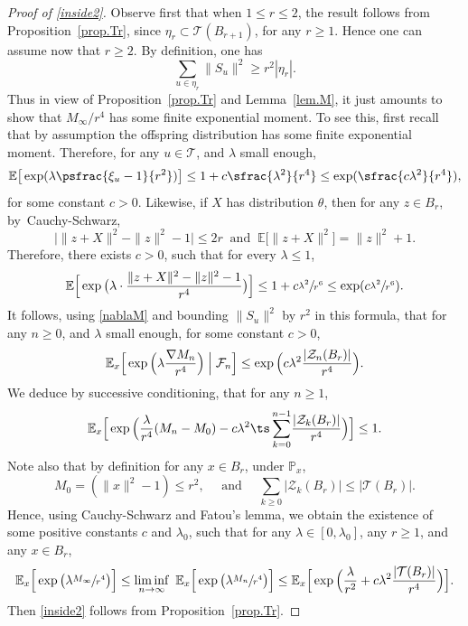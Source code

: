 \begin{proof}[Proof of \eqref{inside2}]
Observe first that when $1\le r\le 2$, the result follows from Proposition~\ref{prop.Tr}, since $\eta_r \subset \mathcal T(B_{r+1})$, for any $r\ge 1$. Hence one can assume now that $r\ge 2$.
By definition, one has
\[
\sum_{u\in \eta_r}\|S_u\|^2\ge r^2
|\eta_r|.
\]
Thus in view of Proposition~\ref{prop.Tr} and Lemma~\ref{lem.M},
it just amounts to show that $M_\infty/r^4$ has some finite exponential moment. To see this, first recall that by assumption the offspring distribution has some finite
exponential moment. Therefore, for any $u\in \mathbf {\mathcal T}$,
and $\lambda$ small enough,
\[
\mathbb E \big[\exp(\lambda \psfrac{\xi_u - 1}{r^2})\big] \le 1+ c\sfrac{\lambda^2}{r^4} \le \exp(\sfrac{c\lambda^2}{r^4}),
\]
for some constant $c>0$. Likewise, if $X$ has distribution $\theta$, then for any $z\in B_r$, by~Cauchy-Schwarz,
\[
\big|\|z+X\|^2 - \|z\|^2 - 1\big| \le 2r \ \text{ and }\ \mathbb E\big[\|z+X\|^2\big] = \|z\|^2 + 1.
\]
Therefore, there exists $c>0$, such that for every $\lambda\le 1$,
\[
\mathbb E \Big[\exp\big(\lambda\cdot \frac{\|z+X\|^2 - \|z\|^2 - 1}{r^4}\big)\Big] \le 1+ c\sfrac{\lambda^2}{r^6} \le \exp(c\sfrac{\lambda^2}{r^6}).
\]
It follows, using \eqref{nablaM} and bounding $\|S_u\|^2$ by $r^2$ in this formula,
that for any $n\ge 0$, and $\lambda$ small enough, for some constant $c>0$,
\[
\mathbb E_x\Big[\exp\Big(\lambda \frac{\nabla M_n}{r^4}\Big)
\Bigm|\mathcal F_n\Big] \le \exp\Big(c\lambda^2
\frac{|\mathcal Z_n(B_r)|}{r^4}\Big).
\]
We deduce by successive conditioning, that for any $n\ge 1$,
\[
\mathbb E_x\Big[\exp\Big(\frac{\lambda}{r^4}(M_n - M_0)
- c\lambda^2 {\ts\sum_{k= 0}^{n-1}} \frac{|\mathcal Z_k(B_r)|}{r^4}\Big)\Big] \le 1.
\]
Note also that by definition for any $x\in B_r$, under $\mathbb P_x$,
\[
M_0= (\|x\|^2-1) \le r^2,\quad
\text{ and }\quad \sum_{k\ge 0} |\mathcal Z_k(B_r)|\le |\mathcal T(B_r)|.
\]
Hence, using Cauchy-Schwarz and Fatou's lemma, we obtain the existence of some positive constants $c$ and $\lambda_0$, such that for any $\lambda\in[0,\lambda_0]$, any $r\ge 1$, and any $x\in B_r$,
\[
\mathbb E_x\Big[\exp\big(\lambda\sfrac{M_\infty}{r^4}\big)\Big]
\le \liminf_{n\to \infty} \ \mathbb E_x\Big[\exp\big(\lambda\sfrac{M_n}{r^4}\big)\Big]
\le \mathbb E_x\Big[\exp\Big(\frac{\lambda}{r^2}+
c\lambda^2\frac{|\mathcal T(B_r)|}{r^4}\Big)\Big].
\]
Then \eqref{inside2} follows from Proposition~\ref{prop.Tr}.
\end{proof}

